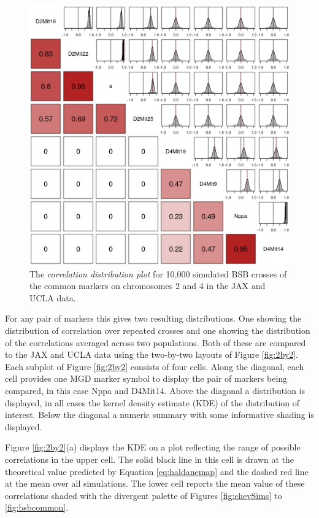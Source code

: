 \documentclass[sts]{imsart}
\begin{document}
\begin{figure}[t]
  \begin{center}
      \includegraphics[scale = 0.5]{../img/bsbCorrDist.png}
  \end{center}
  \caption{The \emph{correlation distribution plot} for 10,000 simulated BSB crosses of the common markers on chromosomes 2 and 4 in the JAX and UCLA data.}
  \label{fig:bsbcorrDist}
\end{figure}

For any pair of markers this gives two resulting distributions. One showing the distribution of correlation over repeated crosses and one showing the distribution of the correlations averaged across two populations. Both of these are compared to the JAX and UCLA data using the two-by-two layouts of Figure \ref{fig:2by2}.
Each subplot of Figure \ref{fig:2by2} consists of four cells. Along the diagonal, each cell provides one MGD marker symbol to display the pair of markers being compared, in this case Nppa and D4Mit14. Above the diagonal a distribution is displayed, in all cases the kernel density estimate (KDE) of the distribution of interest. Below the diagonal a numeric summary with some informative shading is displayed.

Figure \ref{fig:2by2}(a) displays the KDE on a plot reflecting the range of possible correlations in the upper cell. The solid black line in this cell is drawn at the theoretical value predicted by Equation \ref{eq:haldanemap} and the dashed red line at the mean over all simulations. The lower cell reports the mean value of these correlations shaded with the divergent palette of Figures \ref{fig:chevSims} to \ref{fig:bsbcommon}.
\end{document}
